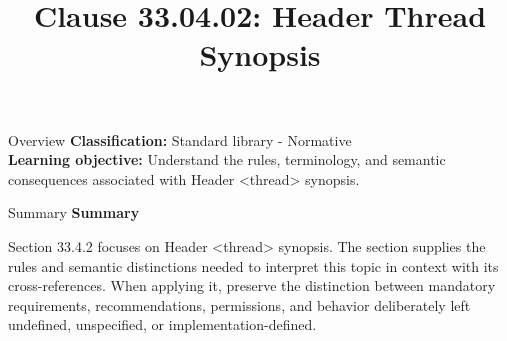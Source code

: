 \documentclass[10pt,letterpaper]{article}
\title{Clause 33.04.02: Header Thread Synopsis}
\author{}
\date{}
\begin{document}
\maketitle
\begin{CornellOverviewBox}{Overview}
\textbf{Classification:} Standard library - Normative\\[2pt]
\textbf{Learning objective:} Understand the rules, terminology, and semantic consequences associated with Header <thread> synopsis.
\end{CornellOverviewBox}\begin{CornellSummaryBox}{Summary}
{\sffamily\bfseries\color{Accent} Summary}\par\vspace{3pt}Section 33.4.2 focuses on Header <thread> synopsis. The section supplies the rules and semantic distinctions needed to interpret this topic in context with its cross-references. When applying it, preserve the distinction between mandatory requirements, recommendations, permissions, and behavior deliberately left undefined, unspecified, or implementation-defined.
\end{CornellSummaryBox}
\end{document}
